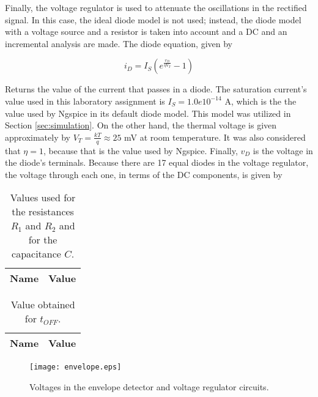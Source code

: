 \par

Finally, the voltage regulator is used to attenuate the oscillations in the rectified signal. In this case, the ideal diode model is not used; instead, the diode model with a voltage source and a resistor is taken into account and a DC and an incremental analysis are made. The diode equation, given by

\begin{equation} \label{eq:diode_equation}
  i_D=I_S\left(e^{\frac{v_D}{\eta V_T}}-1\right)
\end{equation}

Returns the value of the current that passes in a diode. The saturation current's value used in this laboratory assignment is $I_S=1.0e10^{-14}$ A, which is the the value used by Ngspice in its default diode model. This model was utilized in Section \ref{sec:simulation}. On the other hand, the thermal voltage is given approximately by $V_T=\frac{kT}{q}\approx 25$ mV at room temperature. It was also considered that $\eta=1$, because that is the value used by Ngspice. Finally, $v_D$ is the voltage in the diode's terminals. Because there are 17 equal diodes in the voltage regulator, the voltage through each one, in terms of the DC components, is given by






\begin{table}[H]
  \centering
  \begin{tabular}{|c|c|}
    \hline    
    {\bf Name} & {\bf Value} \\ \hline
    
  \end{tabular}
  \caption{Values used for the resistances $R_1$ and $R_2$ and for the capacitance $C$.}
  \label{tab:ChosenValues}
\end{table}




\begin{table}[H]
  \centering
  \begin{tabular}{|c|c|}
    \hline    
    {\bf Name} & {\bf Value} \\ \hline
    
  \end{tabular}
  \caption{Value obtained for $t_{OFF}$.}
  \label{tab:tOFF}
\end{table}


\begin{figure}[H] \centering
  \texttt{[image: envelope.eps]}
  \caption{Voltages in the envelope detector and voltage regulator circuits.}
  \label{fig:envelope_regulator_voltages}
\end{figure}
